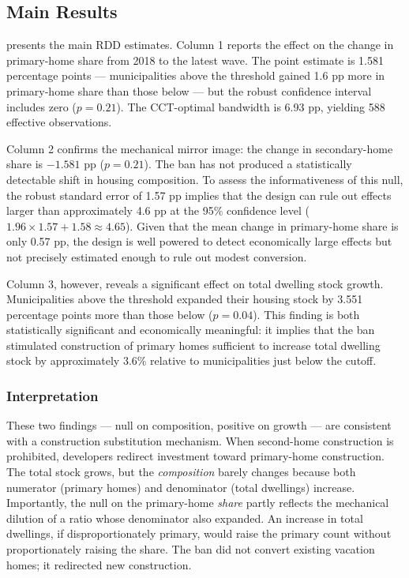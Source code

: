 \documentclass[12pt]{article}
\begin{document}
\subsection{Main Results}

 presents the main RDD estimates. Column 1 reports the effect on the change in primary-home share from 2018 to the latest wave. The point estimate is 1.581 percentage points --- municipalities above the threshold gained 1.6 pp more in primary-home share than those below --- but the robust confidence interval includes zero ($p = 0.21$). The CCT-optimal bandwidth is 6.93 pp, yielding 588 effective observations.

Column 2 confirms the mechanical mirror image: the change in secondary-home share is $-1.581$ pp ($p = 0.21$). The ban has not produced a statistically detectable shift in housing composition. To assess the informativeness of this null, the robust standard error of 1.57 pp implies that the design can rule out effects larger than approximately 4.6 pp at the 95\% confidence level ($1.96 \times 1.57 + 1.58 \approx 4.65$). Given that the mean change in primary-home share is only 0.57 pp, the design is well powered to detect economically large effects but not precisely estimated enough to rule out modest conversion.

Column 3, however, reveals a significant effect on total dwelling stock growth. Municipalities above the threshold expanded their housing stock by 3.551 percentage points more than those below ($p = 0.04$). This finding is both statistically significant and economically meaningful: it implies that the ban stimulated construction of primary homes sufficient to increase total dwelling stock by approximately 3.6\% relative to municipalities just below the cutoff.



\subsubsection*{Interpretation} These two findings --- null on composition, positive on growth --- are consistent with a construction substitution mechanism. When second-home construction is prohibited, developers redirect investment toward primary-home construction. The total stock grows, but the \textit{composition} barely changes because both numerator (primary homes) and denominator (total dwellings) increase. Importantly, the null on the primary-home \textit{share} partly reflects the mechanical dilution of a ratio whose denominator also expanded. An increase in total dwellings, if disproportionately primary, would raise the primary count without proportionately raising the share. The ban did not convert existing vacation homes; it redirected new construction.
\end{document}
